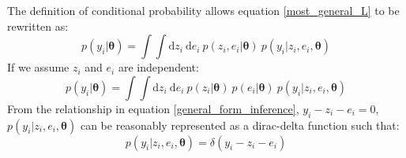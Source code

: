 \begin{tcolorbox}[enhanced jigsaw,breakable,pad at break*=1mm,title=Technical figure 1: General likelihood derivation, title filled,fonttitle=\sffamily\bfseries,fontupper=\sffamily\scriptsize]
\begin{multicols}{2}
The definition of conditional probability allows equation \ref{most_general_L} to be rewritten as:
\begin{equation}
p(y_i|\bm{\theta}) = \int \int \text{d}z_i\ \text{d}e_i\ p(z_i,e_i|\bm{\theta})\ p(y_i|z_i,e_i,\bm{\theta})
\end{equation}
If we assume $z_i$ and $e_i$ are independent:
\begin{equation}
p(y_i|\bm{\theta}) = \int \int \text{d}z_i\ \text{d}e_i\ p(z_i|\bm{\theta})\ p(e_i|\bm{\theta})\ p(y_i|z_i,e_i,\bm{\theta})
\label{halfway_through_derivation}
\end{equation}
From the relationship in equation \ref{general_form_inference}, $y_i-z_i-e_i = 0$, $p(y_i|z_i,e_i,\bm{\theta})$ can be reasonably represented as a dirac-delta function such that:
\begin{equation}
p(y_i|z_i,e_i,\bm{\theta}) = \delta(y_i-z_i-e_i)
\label{dirac_equality}
\end{equation}


\end{multicols}
\end{tcolorbox}
